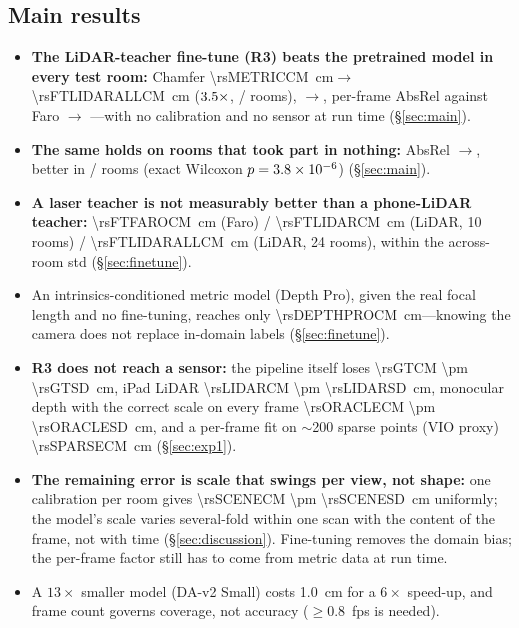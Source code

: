 \subsection{Main results}
\begin{itemize}
\item \textbf{The LiDAR-teacher fine-tune (R3) beats the pretrained model in every test room:} Chamfer
\SI{\rsMETRICCM}{cm}$\rightarrow$\SI{\rsFTLIDARALLCM}{cm} ($3.5\times$, \rsMAINWINS/\rsMAINN{} rooms), \fscore{}
\rsMETRICF$\rightarrow$\rsFTLIDARALLF, per-frame AbsRel against Faro \rsMETRICSIXABSREL$\rightarrow$\rsFTLIDARALLABSREL{}
---with no calibration and no sensor at run time (\S\ref{sec:main}).
\item \textbf{The same holds on \rsVN{} rooms that took part in nothing:} AbsRel \rsVMETRICABSREL$\rightarrow$\rsVFTALLABSREL,
better in \rsVWINS/\rsVN{} rooms (exact Wilcoxon $p=3.8\times10^{-6}$) (\S\ref{sec:main}).
\item \textbf{A laser teacher is not measurably better than a phone-LiDAR teacher:} \SI{\rsFTFAROCM}{cm} (Faro) /
\SI{\rsFTLIDARCM}{cm} (LiDAR, 10 rooms) / \SI{\rsFTLIDARALLCM}{cm} (LiDAR, 24 rooms), within the across-room std
(\S\ref{sec:finetune}).
\item An intrinsics-conditioned metric model (Depth Pro), given the real focal length and no fine-tuning, reaches only
\SI{\rsDEPTHPROCM}{cm}---knowing the camera does not replace in-domain labels (\S\ref{sec:finetune}).
\item \textbf{R3 does not reach a sensor:} the pipeline itself loses \SI{\rsGTCM \pm \rsGTSD}{cm}, iPad LiDAR
\SI{\rsLIDARCM \pm \rsLIDARSD}{cm}, monocular depth with the correct scale on every frame
\SI{\rsORACLECM \pm \rsORACLESD}{cm}, and a per-frame fit on $\sim$200 sparse points (VIO proxy) \SI{\rsSPARSECM}{cm}
(\S\ref{sec:exp1}).
\item \textbf{The remaining error is scale that swings per view, not shape:} one calibration per room gives
\SI{\rsSCENECM \pm \rsSCENESD}{cm} uniformly; the model's scale varies several-fold within one scan with the content of
the frame, not with time (\S\ref{sec:discussion}). Fine-tuning removes the domain bias; the per-frame factor still has
to come from metric data at run time.
\item A $13\times$ smaller model (DA-v2 Small) costs \SI{1.0}{cm} for a $6\times$ speed-up, and frame count governs
coverage, not accuracy ($\geq 0.8$~fps is needed).
\end{itemize}

